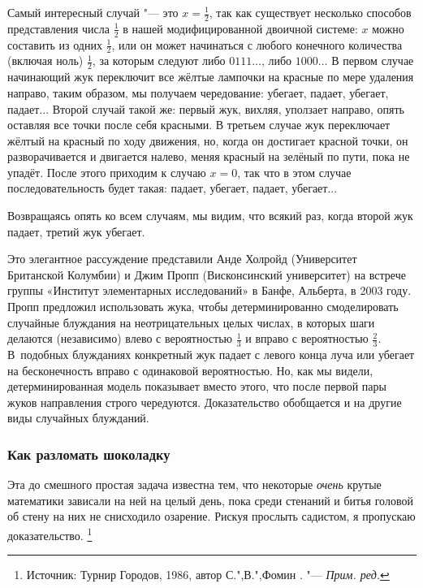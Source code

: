 \documentclass[twoside]{book}
\begin{document}
Самый интересный случай "--- это $x=\tfrac12$, так как существует несколько способов представления числа $\tfrac12$ в нашей модифицированной двоичной системе: $x$ можно составить из одних $\tfrac12$, или он может начинаться с любого конечного количества (включая ноль) $\tfrac12$, за которым следуют либо $0111\dots$, либо $1000\dots$
В первом случае начинающий жук переключит все жёлтые лампочки на красные по мере удаления направо, таким образом, мы получаем чередование: убегает, падает, убегает, падает...
Второй случай такой же: первый жук, вихляя, уползает направо, опять оставляя все точки после себя красными.
В третьем случае жук переключает жёлтый на красный по ходу движения, но, когда он достигает красной точки, он разворачивается и двигается налево, меняя красный на зелёный по пути, пока не упадёт.
После этого приходим к случаю $x = 0$, так что в этом случае  последовательность будет такая: падает, убегает, падает, убегает...

Возвращаясь опять ко всем случаям, мы видим, что всякий раз, когда второй жук падает, третий жук убегает.
\heart

Это элегантное рассуждение представили
Анде Холройд (Университет Британской Колумбии) и Джим Пропп (Висконсинский университет) на встрече группы «Институт элементарных исследований» в Банфе, Альберта, в 2003 году. %
Пропп предложил использовать жука, чтобы детерминированно смоделировать случайные блуждания на неотрицательных целых числах, в которых шаги делаются (независимо) влево с вероятностью $\tfrac13$ и вправо с вероятностью $\tfrac23$.
В~подобных блужданиях конкретный жук падает с левого конца луча или убегает на бесконечность вправо с одинаковой вероятностью.
Но, как мы видели, детерминированная модель показывает вместо этого, что после первой пары жуков направления строго чередуются.
Доказательство обобщается и на другие виды случайных блужданий.

\subsubsection*{Как разломать шоколадку}%

Эта до смешного простая задача известна тем, что некоторые \emph{очень} крутые математики зависали на ней на целый день, пока среди  стенаний и битья головой об стену на них не снисходило озарение.
Рискуя прослыть садистом, я пропускаю доказательство.%
\footnote{Источник: Турнир Городов, 1986, автор  С.",В.",Фомин \cite[№97909]{problems}. "--- \emph{Прим. ред.}}
\end{document}
